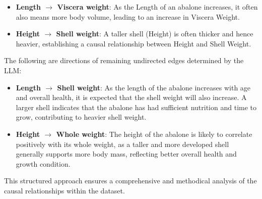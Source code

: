 \documentclass{article}
\begin{document}
\begin{minipage}[t]{0.6\linewidth}
\begin{itemize}
                \item \textbf{Length $\rightarrow$ Viscera weight}: As the Length of an abalone increases, it often also means more body volume, leading to an increase in Viscera Weight.
                
                \item \textbf{Height $\rightarrow$ Shell weight}: A taller shell (Height) is often thicker and hence heavier, establishing a causal relationship between Height and Shell Weight.
                
            \end{itemize}
            
The following are directions of remaining undirected edges determined by the LLM:
            \begin{itemize}
            \item \textbf{Length $\rightarrow$ Shell weight}: As the length of the abalone increases with age and overall health, it is expected that the shell weight will also increase. A larger shell indicates that the abalone has had sufficient nutrition and time to grow, contributing to heavier shell weight.

            \item \textbf{Height $\rightarrow$ Whole weight}: The height of the abalone is likely to correlate positively with its whole weight, as a taller and more developed shell generally supports more body mass, reflecting better overall health and growth condition.
            \end{itemize}
            
This structured approach ensures a comprehensive and methodical analysis of the causal relationships within the dataset.
        
\vfill
\end{minipage}
\hfill
\end{document}
